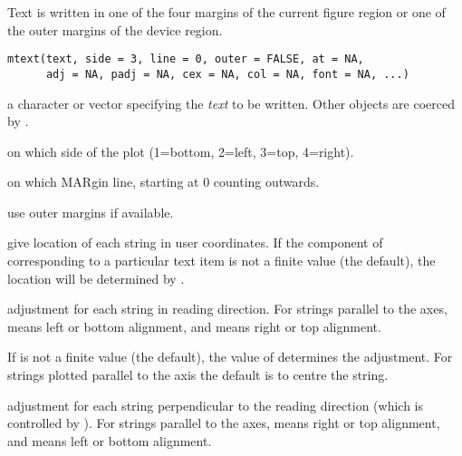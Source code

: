 %
\begin{Description}\relax
Text is written in one of the four margins of the current figure region
or one of the outer margins of the device region.
\end{Description}
%
\begin{Usage}
\begin{verbatim}
mtext(text, side = 3, line = 0, outer = FALSE, at = NA,
      adj = NA, padj = NA, cex = NA, col = NA, font = NA, ...)
\end{verbatim}
\end{Usage}
%
\begin{Arguments}
\begin{ldescription}
\item[\code{text}] a character or  vector specifying
the \emph{text} to be written.  Other objects are coerced by
.
\item[\code{side}] on which side of the plot (1=bottom, 2=left, 3=top, 4=right).
\item[\code{line}] on which MARgin line, starting at 0 counting outwards.
\item[\code{outer}] use outer margins if available.
\item[\code{at}] give location of each string in user coordinates.  If the
component of  corresponding to a particular text item is
not a finite value (the default), the location will be determined
by .
\item[\code{adj}] adjustment for each string in reading direction.  For
strings parallel to the axes,  means left or bottom
alignment, and  means right or top alignment.

If  is not a finite value (the default), the value of
 determines the adjustment.  For strings plotted
parallel to the axis the default is to centre the string.
\item[\code{padj}] adjustment for each string perpendicular to the reading
direction (which is controlled by ).  For strings parallel
to the axes,  means right or top alignment, 
and  means left or bottom alignment.


\end{ldescription}
\end{Arguments}
